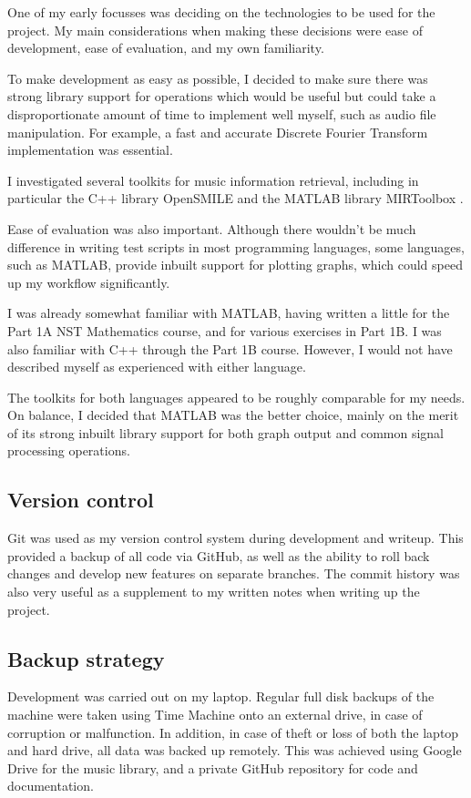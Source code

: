 \documentclass[12pt,a4paper,twoside,openright]{report}
\begin{document}
One of my early focusses was deciding on the technologies to be used for the project. My main considerations when making these decisions were ease of development, ease of evaluation, and my own familiarity.

To make development as easy as possible, I decided to make sure there was strong library support for operations which would be useful but could take a disproportionate amount of time to implement well myself, such as audio file manipulation. For example, a fast and accurate Discrete Fourier Transform implementation was essential.

I investigated several toolkits for music information retrieval, including in particular the C++ library OpenSMILE \cite{Eyben10} and the MATLAB library MIRToolbox \cite{Lartillot07}.

Ease of evaluation was also important. Although there wouldn't be much difference in writing test scripts in most programming languages, some languages, such as MATLAB, provide inbuilt support for plotting graphs, which could speed up my workflow significantly.

I was already somewhat familiar with MATLAB, having written a little for the Part 1A NST Mathematics course, and for various exercises in Part 1B. I was also familiar with C++ through the Part 1B course. However, I would not have described myself as experienced with either language.

The toolkits for both languages appeared to be roughly comparable for my needs. On balance, I decided that MATLAB was the better choice, mainly on the merit of its strong inbuilt library support for both graph output and common signal processing operations.


\subsection{Version control}

Git was used as my version control system during development and writeup. This provided a backup of all code via GitHub, as well as the ability to roll back changes and develop new features on separate branches. The commit history was also very useful as a supplement to my written notes when writing up the project.


\subsection{Backup strategy}

Development was carried out on my laptop. Regular full disk backups of the machine were taken using Time Machine onto an external drive, in case of corruption or malfunction. In addition, in case of theft or loss of both the laptop and hard drive, all data was backed up remotely. This was achieved using Google Drive for the music library, and a private GitHub repository for code and documentation.
\end{document}
